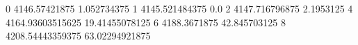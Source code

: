 0 4146.57421875 1.052734375
1 4145.521484375 0.0
2 4147.716796875 2.1953125
4 4164.93603515625 19.41455078125
6 4188.3671875 42.845703125
8 4208.54443359375 63.02294921875
